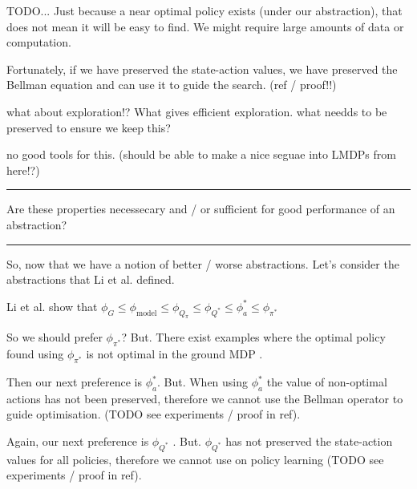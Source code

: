 
{\color{red}TODO...}
Just because a near optimal policy exists (under our abstraction), that does not mean it will be easy to find. We might require large amounts of data or computation.

Fortunately, if we have preserved the state-action values, we have preserved the Bellman equation and can use it to guide the search. {\color{red}(ref / proof!!)}

{\color{red}what about exploration}!?
What gives efficient exploration. what needds to be preserved to ensure we keep this?

{\color{red}no good tools for this. (should be able to make a nice seguae into LMDPs from here!?)}

\begin{center}\rule{0.5\linewidth}{\linethickness}\end{center}
  {\color{red}Are these properties necessecary and / or sufficient for good performance of an abstraction?}
\begin{center}\rule{0.5\linewidth}{\linethickness}\end{center}

So, now that we have a notion of better / worse abstractions. Let's consider the abstractions
that Li et al. \cite{Littman2006} defined.

Li et al. \cite{Littman2006} show that $\phi_G \le \phi_{\text{model}} \le \phi_{Q_{\pi}} \le \phi_{Q^{* }} \le \phi_a^{* } \le \phi_{\pi^{* }}$

So we should prefer $\phi_{\pi^{* }}$? But. There exist examples where the
optimal policy found using $\phi_{\pi^{* }}$ is not optimal in the ground MDP \cite{Jong2005}.

Then our next preference is $\phi_a^{* }$. But. When using $\phi_a^{* }$ the value of non-optimal actions has not been preserved,
therefore we cannot use the Bellman operator to guide optimisation. ({\color{red}TODO} see experiments / proof in ref).

Again, our next preference is $\phi_{Q^{* }}$ .
But. $\phi_{Q^{* }}$ has not preserved the state-action values for all policies,
therefore we cannot use on policy learning ({\color{red}TODO} see experiments / proof in ref).



